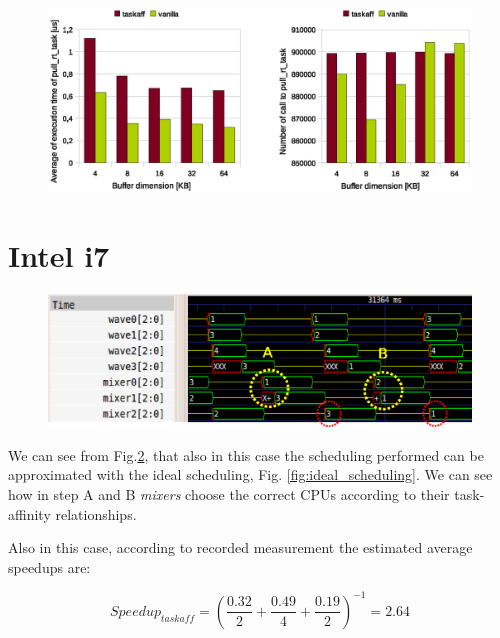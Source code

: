 \begin{figure}[htbp]
\centering
\includegraphics[width=\widefigure]{images/results_xeon/pull_xeon.eps}
\caption{}
\label{fig:pull_xeon}
\end{figure}

\newpage
\section{Intel i7}

\begin{figure}[htbp]
\centering
\includegraphics[width=\widefigure]{images/results_i7/final_i7.eps}
\caption{}
\label{fig:trace_i7}
\end{figure}

We can see from Fig.\ref{fig:trace_i7}, that also in this case the scheduling performed can be approximated with the ideal scheduling, Fig.
\ref{fig:ideal_scheduling}. We can see how in step A and B \textit{mixers} choose the correct CPUs according to their task-affinity relationships.

Also in this case, according to recorded measurement the estimated average speedups are:

\begin{equation}
  Speedup_{taskaff} = \left(\frac{0.32}{2} + \frac{0.49}{4} + \frac{0.19}{2} \right)^{-1} = 2.64
\label{eq:speedup_i7_taskaff}
\end{equation}

